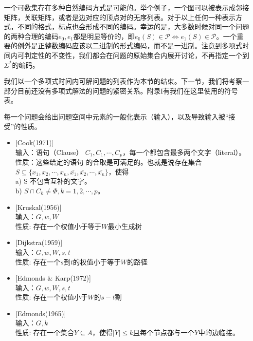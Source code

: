 \documentclass[twocolumn]{article}
\theoremstyle{nonumberplain}%
\begin{document}
\begin{CJK}{UTF8}{gbsn}
    一个可数集存在多种自然编码方式是可能的。举个例子，一个图可以被表示成邻接矩阵，关联矩阵，或者是边对应的顶点对的无序列表。对于以上任何一种表示方式，不同的格式，标点也会形成不同的编码。幸运的是，大多数时候对同一个问题的两种合理的编码$e_0,e_1$都是明显等价的，即$e_0(S)\in\mathcal{P}\Leftrightarrow e_1(S)\in\mathcal{P}$。一个重要的例外是正整数编码应该以二进制的形式编码，而不是一进制。注意到多项式时间内可判定性的不变性，我们都会在问题的原始集合内展开讨论，不再指定一个到$\Sigma^*$的编码。

    我们以一个多项式时间内可解问题的列表作为本节的结束。下一节，我们将考察一部分目前还没有多项式解法的问题的紧密关系。附录I有我们在这里使用的符号表。

    每一个问题会给出问题空间中元素的一般化表示（输入），以及导致输入被“接受”的性质。

    \begin{itemize}
    \item {}[Cook(1971)]\\
    输入：语句（Clause） $C_1,C_1,\cdots,C_p$，每一个都包含最多两个文字（literal）。\\
    性质：这些给定的语句 的合取是可满足的。也就是说存在集合$S\subseteq\{x_1,x_2,\cdots,x_n,\bar{x_1},\bar{x_2},\cdots,\bar{x_n}\}$，使得 \\
    a) S 不包含互补的文字。\\
    b) $S\cap C_k \neq \Phi, k = 1,2,\cdots,p$。

    \item {}[Kruskal(1956)]\\
    输入：$G, w, W$\\
    性质: 存在一个权值小于等于$W$最小生成树

    \item {}[Dijkstra(1959)]\\
    输入：$G, w, W, s, t$\\
    性质: 存在一个$s$到$t$的权值小于等于$W$的路径

    \item {}[Edmonds \& Karp(1972)]\\
    输入：$G, w, W, s, t$\\
    性质: 存在一个权值小于$W$的$s-t$割

    \item {}[Edmonds(1965)]\\
    输入：$G, k$\\
    性质: 存在一个集合$Y\subseteq A$，使得$|Y|\le k$且每个节点都与一个$Y$中的边临接。


\end{itemize}
\end{CJK}
\end{document}
